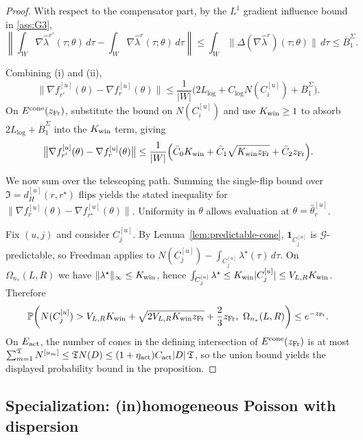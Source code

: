 \documentclass{statsoc}
\newcommand{\1}{\mathbbm{1}}
\newcommand{\Tmax}{\mathfrak{T}}
\begin{document}
\begin{proof}
With respect to the compensator part, by the $L^1$ gradient influence bound in \cref{ass:G3},
\[
\left\|\int_W \nabla\widehat\lambda^{r'}(\tau;\theta)\,d\tau - \int_W \nabla\widehat\lambda^{r}(\tau;\theta)\,d\tau\right\|
\le \int_W \|\Delta(\nabla\widehat\lambda^{r})(\tau;\theta)\|\,d\tau
\le \overline B_1^\Sigma.
\]

Combining (i) and (ii),
\[
\big\|\nabla f_{r'}^{[u]}(\theta)-\nabla f_{r}^{[u]}(\theta)\big\|
\le
\frac{1}{|W|}\Big(2L_{\log}+C_{\log}N(C_{i}^{[u]})+\overline B_1^\Sigma\Big).
\]
On $E^{\rm cone}(z_{\rm Fr})$, substitute the bound on $N(C_i^{[u]})$ and use $K_{\rm win}\ge 1$ to absorb
$2L_{\log}+\overline B_1^\Sigma$ into the $K_{\rm win}$ term, giving
\[
\big\|\nabla f_{r'}^{[u]}(\theta)-\nabla f_{r}^{[u]}(\theta)\big\|
\le
\frac{1}{|W|}\Big(\bar C_0 K_{\rm win} + \bar C_1\sqrt{K_{\rm win} z_{\rm Fr}} + \bar C_2 z_{\rm Fr}\Big).
\]

We now sum over the telescoping path. Summing the single-flip bound over $\mathfrak I=d_H^{[u]}(r,r^\star)$ flips yields the stated inequality for
$\|\nabla f_r^{[u]}(\theta)-\nabla f_{r^\star}^{[u]}(\theta)\|$.
Uniformity in $\theta$ allows evaluation at $\theta=\hat\theta_r^{[u]}$.

Fix $(u,j)$ and consider $C_j^{[u]}$. By Lemma~\ref{lem:predictable-cone},
$\mathbf 1_{C_j^{[u]}}$ is $\mathcal G$-predictable, so Freedman applies to
\(
N(C_j^{[u]})-\int_{C_j^{[u]}}\lambda^\star(\tau)\,d\tau.
\)
On $\Omega_{n_*}(L,R)$ we have $\|\lambda^\star\|_\infty\le K_{\rm win}$, hence
$\int_{C_j^{[u]}}\lambda^\star\le K_{\rm win}|C_j^{[u]}|\le V_{L,R}K_{\rm win}$.
Therefore
\[
\mathbb P\!\left(
N(C_j^{[u]})>V_{L,R}K_{\rm win}+\sqrt{2V_{L,R}K_{\rm win}z_{\rm Fr}}+\frac23 z_{\rm Fr},\ \Omega_{n_*}(L,R)
\right)\le e^{-z_{\rm Fr}}.
\]
On $E_{\rm act}$, the number of cones in the defining intersection of $E^{\rm cone}(z_{\rm Fr})$ is at most
$\sum_{m=1}^{\Tmax} N^{[u_m]}\le \Tmax N(D)\le (1+\eta_{\rm act})C_{\rm act}|D|\,\Tmax$, so the union bound yields
the displayed probability bound in the proposition.
\end{proof}

\subsection{Specialization: (in)homogeneous Poisson with dispersion}\label{sec:apppoisson}
\end{document}
